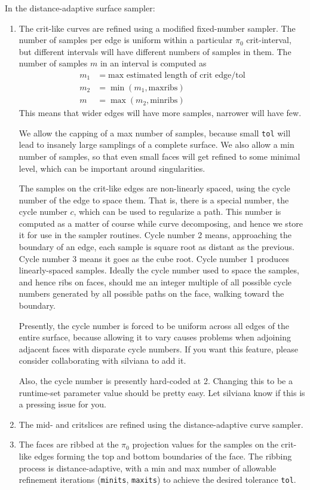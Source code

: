 In the distance-adaptive surface sampler:
\begin{enumerate}
\item The crit-like curves are refined using a modified fixed-number sampler.  The number of samples per edge is uniform within a particular $\pi_0$ crit-interval, but different intervals will have different numbers of samples in them.  The number of samples $m$ in an interval is computed as
\begin{align*}
m_1 &= \text{max estimated length of crit edge} / \text{tol} \\
m_2 &= \min(m_1, \text{maxribs}) \\
m &= \max(m_2, \text{minribs})
\end{align*}
This means that wider edges will have more samples, narrower will have few.

We allow the capping of a max number of samples, because small {\tt tol} will lead to insanely large samplings of a complete surface.  We also allow a min number of samples, so that even small faces will get refined to some minimal level, which can be important around singularities.

The samples on the crit-like edges are non-linearly spaced, using the cycle number of the edge to space them.  That is, there is a special number, the cycle number $c$, which can be used to regularize a path.  This number is computed as a matter of course while curve decomposing, and hence we store it for use in the sampler routines.  Cycle number 2 means, approaching the boundary of an edge, each sample is square root as distant as the previous.  Cycle number 3 means it goes as the cube root.  Cycle number 1 produces linearly-spaced samples.  Ideally the cycle number used to space the samples, and hence ribs on faces, should me an integer multiple of all possible cycle numbers generated by all possible paths on the face, walking toward the boundary.

Presently, the cycle number is forced to be uniform across all edges of the entire surface, because allowing it to vary causes problems when adjoining adjacent faces with disparate cycle numbers.  If you want this feature, please consider collaborating with silviana to add it.

Also, the cycle number is presently hard-coded at 2.  Changing this to be a runtime-set parameter value should be pretty easy.  Let silviana know if this is a pressing issue for you.



\item  The mid- and critslices are refined using the distance-adaptive curve sampler.

\item The faces are ribbed at the $\pi_0$ projection values for the samples on the crit-like edges forming the top and bottom boundaries of the face.  The ribbing process is distance-adaptive, with a min and max number of allowable refinement iterations ({\tt minits}, {\tt maxits}) to achieve the desired tolerance {\tt tol}.
\end{enumerate}


